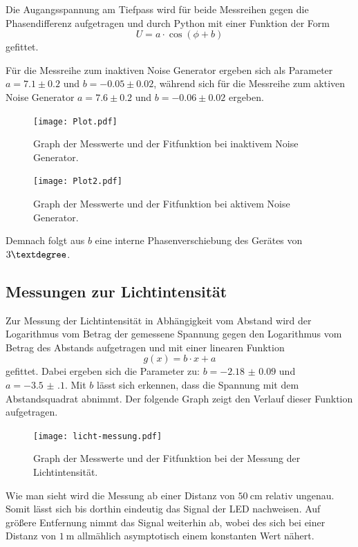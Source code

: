 \documentclass[
  bibliography=totoc,     %
  captions=tableheading,  %
  titlepage=firstiscover, %
]{scrartcl}
\begin{document}
\\
\\
\\
\\
\\
\\
\\
\\
\\
\\
Die Augangsspannung am Tiefpass wird für beide Messreihen gegen die Phasendifferenz
aufgetragen und durch Python mit einer Funktion der Form
\begin{equation}
  U = a \cdot \cos \left( \phi + b \right)
  \label{eqn:fit1}
\end{equation}
gefittet.

Für die Messreihe zum inaktiven Noise Generator ergeben sich als Parameter $a = 7.1 \pm 0.2$
und $b = -0.05 \pm 0.02$, während sich für die Messreihe zum aktiven Noise Generator $a = 7.6 \pm 0.2$
und $b = -0.06 \pm 0.02$ ergeben.
\begin{figure}
  \centering
  \texttt{[image: Plot.pdf]}
  \caption{Graph der Messwerte und der Fitfunktion bei inaktivem Noise Generator.}
  \label{fig:plot1}
\end{figure}
\clearpage
\begin{figure}
  \centering
  \texttt{[image: Plot2.pdf]}
  \caption{Graph der Messwerte und der Fitfunktion bei aktivem Noise Generator.}
  \label{fig:plot2}
\end{figure}
Demnach folgt aus $b$ eine interne Phasenverschiebung des Gerätes von $3 \textdegree$.
\subsection{Messungen zur Lichtintensität}
Zur Messung der Lichtintensität in Abhängigkeit vom Abstand wird der Logarithmus
vom Betrag der gemessene Spannung gegen den Logarithmus vom Betrag des Abstands
aufgetragen und mit einer linearen Funktion
\begin{equation}
  g \left( x \right) = b \cdot x + a
  \label{eqn:fit}
\end{equation}
gefittet.
Dabei ergeben sich die Parameter zu: $b =  \num{-2.18(9)}$ und $a = \num{-3.5(1)}$.
Mit $b$ lässt sich erkennen, dass die Spannung mit dem Abstandsquadrat abnimmt.
Der folgende Graph zeigt den Verlauf dieser Funktion aufgetragen.
\clearpage
\begin{figure}
  \centering
  \texttt{[image: licht-messung.pdf]}
  \caption{Graph der Messwerte und der Fitfunktion bei der Messung der Lichtintensität.}
  \label{fig:plot3}
\end{figure}
Wie man sieht wird die Messung ab einer Distanz von $\SI{50}{\centi\meter}$ relativ
ungenau. Somit lässt sich bis dorthin eindeutig das Signal der LED nachweisen.
Auf größere Entfernung nimmt das Signal weiterhin ab, wobei des sich bei einer Distanz
von $\SI{1}{\meter}$ allmählich asymptotisch einem konstanten Wert nähert.
\newpage
\end{document}
